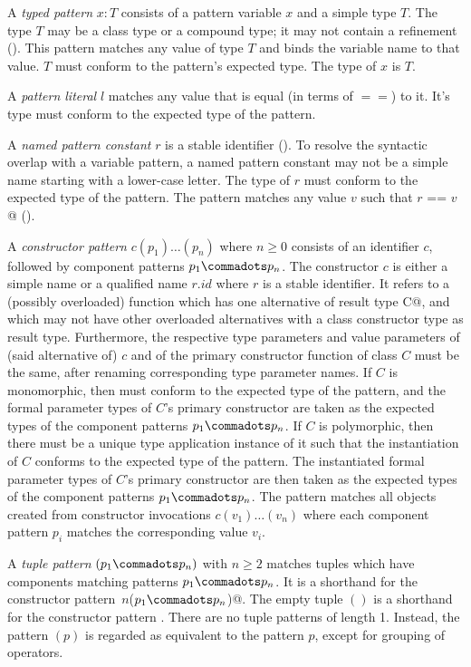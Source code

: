 \documentclass[11pt]{report}
\begin{document}
\begin{itemize}
A {\em typed pattern} $x: T$ consists of a pattern variable $x$ and a
simple type $T$. The type $T$ may be a class type or a compound type;
it may not contain a refinement ().  This
pattern matches any value of type $T$ and binds the variable name to
that value.  $T$ must conform to the pattern's expected type. The
type of $x$ is $T$.

A {\em pattern literal} $l$ matches any value that is equal (in terms
of $==$) to it. It's type must conform to the expected type of the
pattern.

A {\em named pattern constant} $r$ is a stable identifier
(). To resolve the syntactic overlap with a
variable pattern, a named pattern constant may not be a simple name
starting with a lower-case letter. The type of $r$ must conform
to the expected type of the pattern. The pattern matches any value $v$
such that \verb@$r$ == $v$@ ().

A {\em constructor pattern} $c(p_1) \ldots (p_n)$ where $n \geq 0$
consists of an identifier $c$, followed by component patterns $p_1
\commadots p_n$. The constructor $c$ is either a simple name
or a qualified name $r.id$ where $r$ is a stable identifier. It refers
to a (possibly overloaded) function which has one alternative of
result type \verb@class C@, and which may not have other overloaded
alternatives with a class constructor type as result type.
Furthermore, the respective type parameters and value parameters of
(said alternative of) $c$ and of the primary constructor function of
class $C$ must be the same, after renaming corresponding type parameter
names.  If $C$ is monomorphic, then
\verb@C@ must conform to the expected type of the pattern, and the
formal parameter types of $C$'s primary constructor are taken as the
expected types of the component patterns $p_1 \commadots p_n$.  If $C$
is polymorphic, then there must be a unique type application instance
of it such that the instantiation of $C$ conforms to the expected type
of the pattern. The instantiated formal parameter types of $C$'s
primary constructor are then taken as the expected types of the
component patterns $p_1\commadots p_n$.
The pattern matches all objects created from
constructor invocations $c(v_1)\ldots(v_n)$ where each component
pattern $p_i$ matches the corresponding value $v_i$.

A {\em tuple pattern} $(p_1 \commadots p_n)$ with $n \geq 2$ matches
tuples which have components matching patterns $p_1 \commadots p_n$.
It is a shorthand for the constructor pattern
\verb@Tuple$\,n$($p_1 \commadots p_n$)@.
The empty tuple $()$ is a shorthand for the
constructor pattern \verb@Unit@. There are no tuple patterns of length
1.  Instead, the pattern $(p)$ is regarded as equivalent to the
pattern $p$, except for grouping of operators.


\end{itemize}
\end{document}
